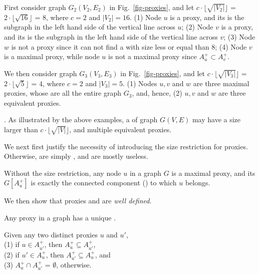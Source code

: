 \vspace{-0.5ex}
\begin{example}
\label{exm-proxies} First consider graph $G_2(V_2, E_2)$ in Fig.~\ref{fig-proxies}, and let $c\cdot\lfloor\sqrt{|V_2|}\rfloor$ =
$2\cdot\lfloor\sqrt{16}\rfloor$ = $8$, where $c = 2$ and $|V_2| = 16$.
\sstab(1) Node $u$ is a proxy, and its \dra is the subgraph in the left hand side of the vertical line across $u$;
\sstab(2) Node $v$ is a proxy, and its \dra is the subgraph in the left hand side of the vertical line across $v$;
\sstab(3) Node $w$ is not a proxy since it can not find a \dra with size less or equal than $8$;
\sstab(4)  Node $v$ is a maximal proxy, while node $u$ is not a maximal proxy since $A^+_u\subset A^+_v$.


We then consider graph $G_3(V_3, E_3)$ in Fig.~\ref{fig-proxies}, and let $c\cdot\lfloor\sqrt{|V_3|}\rfloor$ =
$2\cdot\lfloor\sqrt{5}\rfloor$ = $4$, where $c = 2$ and $|V_3| = 5$.
\sstab(1) Nodes $u, v$ and $w$ are three maximal proxies, whose \dras are all the entire graph $G_3$, and, hence,
\sstab(2) $u, v$ and $w$ are three equivalent proxies.
 \end{example}

\vspace{-1ex}
. As illustrated by the above examples,  a \dra of graph $G(V, E)$ may have a size larger than $c\cdot\lfloor\sqrt{|V|}\rfloor$,
and multiple equivalent proxies.


We next first justify the necessity of introducing the size restriction for proxies.  Otherwise, \dras are simply \ccs, and are mostly useless.


\begin{prop}
\label{prop-proxy-cc} Without the size restriction, any node $u$ in a graph $G$ is a maximal proxy,
and its \dra $G[A^+_u]$ is exactly the connected component (\cc) to which $u$ belongs.
\end{prop}


We then show that proxies and \dras are {\em well defined}.


\begin{prop}
\label{prop-proxy-unique-dra} Any proxy in a graph has a unique \dra.
\end{prop}


\begin{prop}
\label{thm-proxy-disjoint} Given any two distinct proxies $u$ and $u'$, \\
(1) if $u\in A^+_{u'}$, then $A^+_{u}\subseteq A^+_{u'}$, \\
(2) if $u'\in A^+_{u}$, then $A^+_{u'}\subseteq A^+_{u}$,  and \\
(3) $A^+_{u}\cap A^+_{u'}$ = $\emptyset$, otherwise.
\end{prop}


